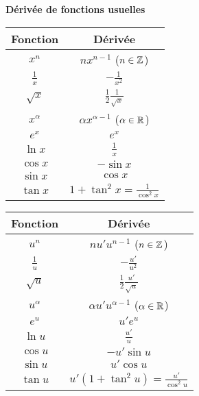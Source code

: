 \documentclass[10pt,class=article,crop=false]{standalone}
\begin{document}
\begin{multicols}{2}
\textbf{Dérivée de fonctions usuelles}

\begin{center}
	\setlength{\arrayrulewidth}{0.05mm}
	\begin{tabular}[t]{|c|c@{\vrule depth 1.2ex height 3ex width 0mm \ }|}
		\hline
		\textbf{Fonction}         & \textbf{Dérivée} \\ \hline
		$x^n$         & $nx^{n-1}$  \quad ($n \in \mathbb{Z}$)   \\ \hline
		$\frac 1x$    & $-\frac{1}{x^2}$              \\ \hline
		$\sqrt{x}$    & $\frac12 \frac1{\sqrt{x}}$   \\ \hline
		$x^\alpha$   & $\alpha x^{\alpha-1}$  \quad ($\alpha\in\mathbb{R}$)  \\ \hline
		$e^x$         & $e^x$                        \\ \hline
		$\ln x$       & $\frac 1x$                   \\ \hline
		$\cos x$      & $-\sin x$                    \\ \hline
		$\sin x$      & $\cos x$                     \\ \hline
		$\tan x$      & $1+\tan^2 x = \frac{1}{\cos^2 x}$        \\ \hline
	\end{tabular}
	\hspace*{0.2cm}
	\begin{tabular}[t]{|c|c@{\vrule depth 1.2ex height 3ex width 0mm \ }|}
		\hline
		\textbf{Fonction}         & \textbf{Dérivée} \\ \hline
		$u^n$         & $nu'u^{n-1}$  \quad  ($n \in \mathbb{Z}$)   \\ \hline
		$\frac 1u$    & $-\frac{u'}{u^2}$              \\ \hline
		$\sqrt{u}$    & $\frac12 \frac{u'}{\sqrt{u}}$   \\ \hline
		$u^\alpha$   & $\alpha u' u^{\alpha-1}$ \quad ($\alpha\in\mathbb{R}$)  \\ \hline
		$e^u$         & $u'e^u$                        \\ \hline
		$\ln u$       & $\frac {u'}{u}$                   \\ \hline
		$\cos u$      & $-u'\sin u$                    \\ \hline
		$\sin u$      & $u'\cos u$                     \\ \hline
		$\tan u$      & $u'(1+\tan^2 u) = \frac{u'}{\cos^2 u}$        \\ \hline
	\end{tabular}
	\hfill
\end{center}



\end{multicols}
\end{document}

